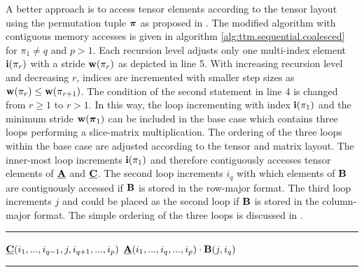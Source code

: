A better approach is to access tensor elements according to the tensor layout using the permutation tuple $\boldsymbol{\pi}$ as proposed in \cite{bassoy:2018:fast}.
The modified algorithm with contiguous memory accesses is given in algorithm \ref{alg:ttm.sequential.coalesced} for $\pi_1 \neq q$ and $p > 1$.
Each recursion level adjusts only one multi-index element $\mathbf{i}(\pi_r)$ with a stride $\mathbf{w}(\pi_r)$ as depicted in line 5.
With increasing recursion level and decreasing $r$, indices are incremented with smaller step sizes as $\mathbf{w}(\pi_r) \leq \mathbf{w}(\pi_{r+1})$. 
The condition of the second  statement in line 4 is changed from $r \geq 1$ to $r > 1$.
In this way, the loop incrementing with index $\mathbf{i}(\pi_1)$ and the minimum stride $\mathbf{w}(\boldsymbol{\pi}_1)$ can be included in the base case which contains three loops performing a slice-matrix multiplication. 
The ordering of the three loops within the base case are adjusted according to the tensor and matrix layout.
The inner-most loop increments $\mathbf{i}(\pi_1)$ and therefore contiguously accesses tensor elements of $\mubA$ and $\mubC$.
The second loop increments $i_q$ with which elements of $\mathbf{B}$ are contiguously accessed if $\mathbf{B}$ is stored in the row-major format.
The third loop increments $j$ and could be placed as the second loop if $\mathbf{B}$ is stored in the column-major format.
The simple ordering of the three loops is discussed in \cite{golub:2013:matrix.computations}.

\begin{algorithm}[t]
\DontPrintSemicolon
{}
%
\footnotesize 
\SetAlgoVlined
\hrule
\BlankLine
{}
{
	{
	}
	{
		{
			\;
		}		
	}	
	\Else%
	{
		{
			{			
				{
					$\underline{\mathbf{C}}(i_1,...,i_{q-1},j,i_{q+1},...,i_{p})$ \ttt{+=} $\underline{\mathbf{A}}(i_1,...,i_q,...,i_p) \cdot \mathbf{B}(j,i_q)$\;
				}
			}
		}
	}
}
\BlankLine
\hrule
\caption{
\footnotesize %
Modified baseline algorithm with contiguous memory access for the tensor-matrix multiplication.
The tensor order must be greater than one and for the contraction mode $1 \leq q \leq p$ and $\pi_1 \neq q$ must hold.
The algorithm needs to be initially called with $r=p$ where $\mbn$ is the shape tuple of $\mubA$ and $m$ is the $q$-th dimension of $\mubC$. 
\label{alg:ttm.sequential.coalesced}
}
\end{algorithm}

